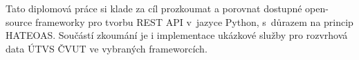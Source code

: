 Tato diplomová práce si klade za cíl prozkoumat a porovnat dostupné open-source frameworky pro tvorbu REST API v~jazyce Python, s~důrazem na princip HATEOAS. Součástí zkoumání je i implementace ukázkové služby pro rozvrhová data ÚTVS ČVUT ve vybraných frameworcích.
